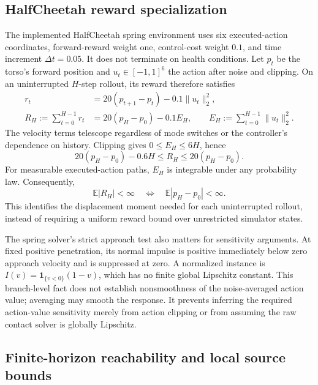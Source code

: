 \subsection{HalfCheetah reward specialization}

The implemented HalfCheetah spring environment uses six executed-action coordinates, forward-reward weight one, control-cost weight $0.1$, and time increment $\Delta t=0.05$. It does not terminate on health conditions. Let $p_t$ be the torso's forward position and $u_t\in[-1,1]^6$ the action after noise and clipping. On an uninterrupted $H$-step rollout, its reward therefore satisfies
\begin{align}
 r_t&=20(p_{t+1}-p_t)-0.1\|u_t\|_2^2,\\
 R_H:=\sum_{t=0}^{H-1}r_t
 &=20(p_H-p_0)-0.1 E_H,\qquad
 E_H:=\sum_{t=0}^{H-1}\|u_t\|_2^2.
\end{align}
The velocity terms telescope regardless of mode switches or the controller's dependence on history. Clipping gives $0\le E_H\le6H$, hence
\begin{equation}
 20(p_H-p_0)-0.6H\le R_H\le20(p_H-p_0).
\end{equation}
For measurable executed-action paths, $E_H$ is integrable under any probability law. Consequently,
\begin{equation}
 \mathbb E|R_H|<\infty\quad\Longleftrightarrow\quad
 \mathbb E|p_H-p_0|<\infty.
\end{equation}
This identifies the displacement moment needed for each uninterrupted rollout, instead of requiring a uniform reward bound over unrestricted simulator states.

The spring solver's strict approach test also matters for sensitivity arguments. At fixed positive penetration, its normal impulse is positive immediately below zero approach velocity and is suppressed at zero. A normalized instance is $I(v)=\mathbf1_{\{v<0\}}(1-v)$, which has no finite global Lipschitz constant. This branch-level fact does not establish nonsmoothness of the noise-averaged action value; averaging may smooth the response. It prevents inferring the required action-value sensitivity merely from action clipping or from assuming the raw contact solver is globally Lipschitz.

\subsection{Finite-horizon reachability and local source bounds}


